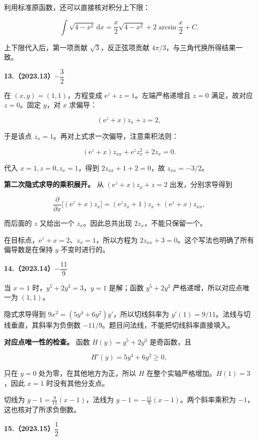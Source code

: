 \documentclass[UTF8,11pt,fontset=windows]{ctexart}
\begin{document}
利用标准原函数，还可以直接核对积分上下限：

$$
\int\sqrt{4-x^2}\,\mathrm dx
=\frac x2\sqrt{4-x^2}+2\arcsin\frac x2+C.
$$

上下限代入后，第一项贡献 $\sqrt3$，反正弦项贡献 $4\pi/3$，与三角代换所得结果一致。

\clearpage

\textbf{13.（2023.13）$-\dfrac32$}

在 $(x,y)=(1,1)$，方程变成 $\mathrm e^z+z=1$。左端严格递增且 $z=0$ 满足，故对应 $z=0$。固定 $y$，对 $x$ 求偏导：

$$
(\mathrm e^z+x)z_x+z=2,
$$

于是该点 $z_x=1$。再对上式求一次偏导，注意乘积法则：

$$
(\mathrm e^z+x)z_{xx}+\mathrm e^z z_x^2+2z_x=0.
$$

代入 $x=1,z=0,z_x=1$，得到 $2z_{xx}+1+2=0$，故 $z_{xx}=-3/2$。

\textbf{第二次隐式求导的乘积展开。} 从 $(\mathrm e^z+x)z_x+z=2$ 出发，分别求导得到

$$
\frac\partial{\partial x}\bigl[(\mathrm e^z+x)z_x\bigr]
=(\mathrm e^zz_x+1)z_x+(\mathrm e^z+x)z_{xx},
$$

而后面的 $z$ 又给出一个 $z_x$。因此总共出现 $2z_x$，不能只保留一个。

在目标点，$\mathrm e^z+x=2$、$z_x=1$，所以方程为 $2z_{xx}+3=0$。这个写法也明确了所有偏导数是在保持 $y$ 不变时进行的。

\clearpage

\textbf{14.（2023.14）$-\dfrac{11}{9}$}

当 $x=1$ 时，$y^5+2y^3=3$，$y=1$ 是解；函数 $y^5+2y^3$ 严格递增，所以对应点唯一为 $(1,1)$。

隐式求导得到 $9x^2=(5y^4+6y^2)y'$，所以切线斜率为 $y'(1)=9/11$。法线与切线垂直，其斜率为负倒数 $-11/9$。题目问法线，不能把切线斜率直接填入。

\textbf{对应点唯一性的检查。} 函数 $H(y)=y^5+2y^3$ 是奇函数，且

$$
H'(y)=5y^4+6y^2\ge0,
$$

只在 $y=0$ 处为零，在其他地方为正，所以 $H$ 在整个实轴严格增加。$H(1)=3$，因此 $x=1$ 时没有其他分支点。

切线为 $y-1=\frac9{11}(x-1)$，法线为 $y-1=-\frac{11}{9}(x-1)$。两个斜率乘积为 $-1$，这也核对了所求负倒数。

\clearpage

\textbf{15.（2023.15）$\dfrac12$}
\end{document}
